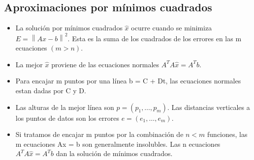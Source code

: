 \documentclass[]{article}
\begin{document}
\subsection{Aproximaciones por mínimos cuadrados}
\begin{itemize}
	\item La solución por mínimos cuadrados $\widehat{x}$ ocurre cuando se minimiza $E=\left \| Ax-b \right \|^{2}$. Esta es la suma de los cuadrados de los errores en las m ecuaciones $(m > n)$.
	\item La mejor $\widehat{x}$ proviene de las ecuaciones normales $A^{T}A\widehat{x}=A^{T}b$.
	\item Para encajar m puntos por una línea b = C + Dt, las ecuaciones normales estan dadas por C y D.
	\item Las alturas de la mejor línea son $p=(p_{1},\ldots,p_{m})$. Las distancias verticales a los puntos de datos son los errores $e=(e_{1},\ldots,e_{m})$.
	\item Si tratamos de encajar m puntos por la combinación de $n<m$ funciones, las m ecuaciones Ax = b son generalmente insolubles. Las n ecuaciones $A^{T}A\widehat{x}=A^{T}b$ dan la solución de mínimos cuadrados.
\end{itemize}
\end{document}
